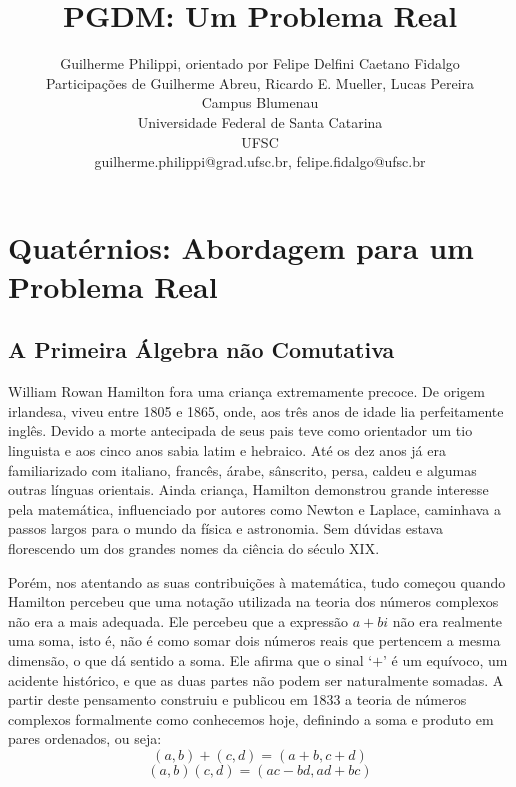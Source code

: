 \documentclass[a4paper,12pt]{article}
\title{PGDM: Um Problema Real}
\author{Guilherme Philippi\Mark{*}, orientado por Felipe Delfini Caetano Fidalgo\Mark{\dagger}\\Participações de Guilherme Abreu, Ricardo E. Mueller, Lucas Pereira\\Campus Blumenau\\Universidade Federal de Santa Catarina\\UFSC
\\guilherme.philippi@grad.ufsc.br\Mark{*}, felipe.fidalgo@ufsc.br\Mark{\dagger}}
\begin{document}
	\maketitle
	\tableofcontents
	\newpage
	
	
	\section{Quatérnios: Abordagem para um Problema Real}
	
	\subsection{A Primeira Álgebra não Comutativa}
	William Rowan Hamilton fora uma criança extremamente precoce. De origem irlandesa, viveu entre 1805 e 1865, onde, aos três anos de idade lia perfeitamente inglês. Devido a morte antecipada de seus pais teve como orientador um tio linguista e aos cinco anos sabia latim e hebraico. Até os dez anos já era familiarizado com italiano, francês, árabe, sânscrito, persa, caldeu e algumas outras línguas orientais. Ainda criança, Hamilton demonstrou grande interesse pela matemática, influenciado por autores como Newton e Laplace, caminhava a passos largos para o mundo da física e astronomia. Sem dúvidas estava florescendo um dos grandes nomes da ciência do século XIX. \cite{BoyerMathHistory,AlgebraAbstrata2BienalSBM}
	
	Porém, nos atentando as suas contribuições à matemática, tudo começou quando Hamilton percebeu que uma notação utilizada na teoria dos números complexos não era a mais adequada. Ele percebeu que a expressão $a + bi$ não era realmente uma soma, isto é, não é como somar dois números reais que pertencem a mesma dimensão, o que dá sentido a soma. Ele afirma que o sinal ‘$+$’ é um equívoco, um acidente histórico, e que as duas partes não podem ser naturalmente somadas. A partir deste pensamento construiu e publicou em 1833 a teoria de números complexos formalmente como conhecemos hoje, definindo a soma e produto em pares ordenados, ou seja:
	\begin{equation*}
	(a,b) + (c,d) = (a + b, c + d)
	\end{equation*}
	\begin{equation*}
	(a, b)(c, d) = (ac-bd, ad + bc)
	\end{equation*}
	
\end{document}
